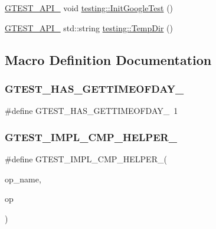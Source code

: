 \begin{DoxyCompactItemize}
$$\item 
\mbox{\hyperlink{_obj__test_2lib_2googletest-release-1_88_81_2googletest_2include_2gtest_2internal_2gtest-port_8h_aa73be6f0ba4a7456180a94904ce17790}{G\+T\+E\+S\+T\+\_\+\+A\+P\+I\+\_\+}} void \mbox{\hyperlink{namespacetesting_ace27eb9a2534996f3711aa719689f987}{testing\+::\+Init\+Google\+Test}} ()
\item 
\mbox{\hyperlink{_obj__test_2lib_2googletest-release-1_88_81_2googletest_2include_2gtest_2internal_2gtest-port_8h_aa73be6f0ba4a7456180a94904ce17790}{G\+T\+E\+S\+T\+\_\+\+A\+P\+I\+\_\+}} std\+::string \mbox{\hyperlink{namespacetesting_aae1bbe7c3cc99bf56263d51d3982a52e}{testing\+::\+Temp\+Dir}} ()
\end{DoxyCompactItemize}


\subsection{Macro Definition Documentation}
\mbox{\label{_obj__test_2lib_2googletest-master_2googletest_2src_2gtest_8cc_a7c139c1711de5a69cbc934e8a082e4f9}} 
\subsubsection{\texorpdfstring{GTEST\_HAS\_GETTIMEOFDAY\_}{GTEST\_HAS\_GETTIMEOFDAY\_}}
{\footnotesize\ttfamily \#define G\+T\+E\+S\+T\+\_\+\+H\+A\+S\+\_\+\+G\+E\+T\+T\+I\+M\+E\+O\+F\+D\+A\+Y\+\_\+~1}

\mbox{\label{_obj__test_2lib_2googletest-master_2googletest_2src_2gtest_8cc_a4a5b6fbde5dd05e05dd6846ac5e5c18e}} 
\subsubsection{\texorpdfstring{GTEST\_IMPL\_CMP\_HELPER\_}{GTEST\_IMPL\_CMP\_HELPER\_}}
{\footnotesize\ttfamily \#define G\+T\+E\+S\+T\+\_\+\+I\+M\+P\+L\+\_\+\+C\+M\+P\+\_\+\+H\+E\+L\+P\+E\+R\+\_\+(\begin{DoxyParamCaption}\item[{}]{op\+\_\+name,  }\item[{}]{op }\end{DoxyParamCaption})}

